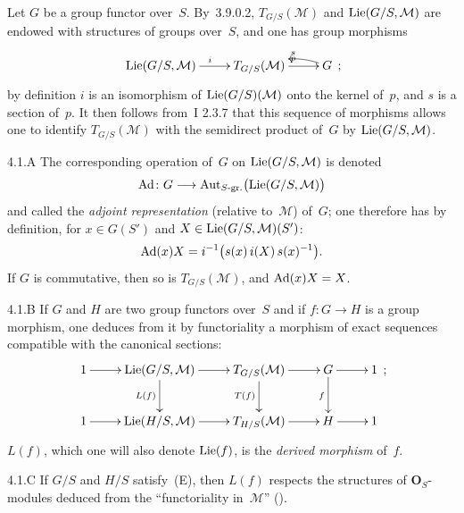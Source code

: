 \label{II.sec.4}

\label{II.4.1}
Let \(G\) be a group functor over~\(S\). By~3.9.0.2,
\(T_{G/S}(\mathcal{M})\) and \(\operatorname{Lie}(G/S,\mathcal{M})\) are endowed with
structures of groups over~\(S\), and one has group morphisms
\[
\xymatrix{
\Lie(G/S,\mathcal{M}) \ar[r]^{i}
  & T_{G/S}(\mathcal{M}) \ar[r]^{p}
  & G \ar@/_/[l]_{s}
}\,;
\]
by definition \(i\) is an isomorphism of \(\operatorname{Lie}(G/S)(\mathcal{M})\) onto the
kernel of~\(p\), and \(s\) is a section of~\(p\). It then follows from~I 2.3.7
that this sequence of morphisms allows one to identify
\(T_{G/S}(\mathcal{M})\) with the semidirect product of~\(G\) by
\(\operatorname{Lie}(G/S,\mathcal{M})\).

\begin{definition}{4.1.A}\label{II.4.1.A}
{\renewcommand{\thefootnote}{(49)}}
The corresponding operation of~\(G\) on \(\operatorname{Lie}(G/S,\mathcal{M})\) is denoted
\[
\operatorname{Ad}\colon G\longrightarrow
  \operatorname{Aut}_{S\text{-gr.}}\bigl(\operatorname{Lie}(G/S,\mathcal{M})\bigr)
\]
and called the \emph{adjoint representation} (relative to~\(\mathcal{M}\))
of~\(G\); one therefore has by definition, for \(x\in G(S')\) and
\(X\in\operatorname{Lie}(G/S,\mathcal{M})(S')\):
\[
\operatorname{Ad}(x)X=i^{-1}\bigl(s(x)\,i(X)\,s(x)^{-1}\bigr).
\]
If \(G\) is commutative, then so is \(T_{G/S}(\mathcal{M})\), and
\(\operatorname{Ad}(x)X=X\).
\end{definition}

\begin{definition}{4.1.B}\label{II.4.1.B}
{\renewcommand{\thefootnote}{(49)}\footnotemark[49]}
If \(G\) and \(H\) are two group functors over~\(S\) and if
\(f\colon G\to H\) is a group morphism, one deduces from it by functoriality
a morphism of exact sequences compatible with the canonical sections:
\[
\xymatrix{
1 \ar[r]
  & \Lie(G/S,\mathcal{M}) \ar[r] \ar[d]_{L(f)}
  & T_{G/S}(\mathcal{M}) \ar[r] \ar[d]_{T(f)}
  & G \ar[r] \ar[d]_{f}
  & 1
\\
1 \ar[r]
  & \Lie(H/S,\mathcal{M}) \ar[r]
  & T_{H/S}(\mathcal{M}) \ar[r]
  & H \ar[r]
  & 1
}\,;
\]
\(L(f)\), which one will also denote \(\operatorname{Lie}(f)\), is the \emph{derived
morphism} of~\(f\).%
{\renewcommand{\thefootnote}{(50)}}
\end{definition}

\begin{remark}{4.1.C}\label{II.4.1.C}
{\renewcommand{\thefootnote}{(51)}}
If \(G/S\) and \(H/S\) satisfy~(E), then \(L(f)\) respects the structures of
\(\mathbf{O}_{S}\)-modules deduced from the ``functoriality in~\(\mathcal{M}\)''
().
\end{remark}

